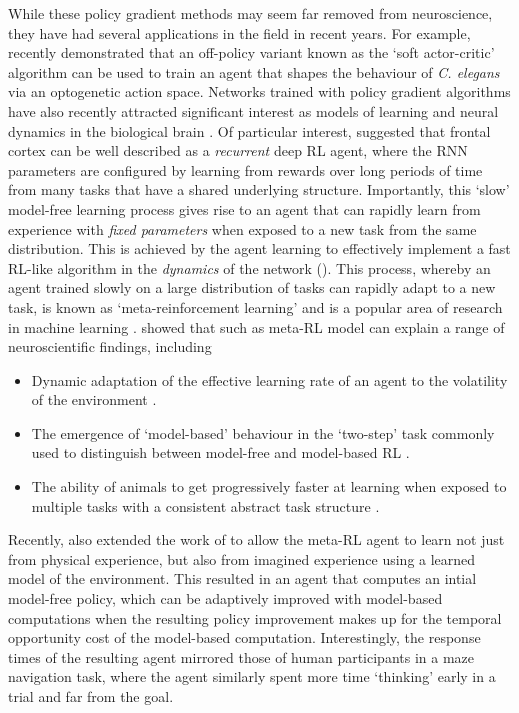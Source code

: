 While these policy gradient methods may seem far removed from neuroscience, they have had several applications in the field in recent years.
For example, \citet{li2022integrating} recently demonstrated that an off-policy variant known as the `soft actor-critic' algorithm \citep{haarnoja2018soft} can be used to train an agent that shapes the behaviour of \textit{C. elegans} via an optogenetic action space.
Networks trained with policy gradient algorithms have also recently attracted significant interest as models of learning and neural dynamics in the biological brain \citep{wang2018prefrontal, jensen2023recurrent, merel2019deep}.
Of particular interest, \citet{wang2018prefrontal} suggested that frontal cortex can be well described as a \emph{recurrent} deep RL agent, where the RNN parameters are configured by learning from rewards over long periods of time from many tasks that have a shared underlying structure.
Importantly, this `slow' model-free learning process gives rise to an agent that can rapidly learn from experience with \emph{fixed parameters} when exposed to a new task from the same distribution.
This is achieved by the agent learning to effectively implement a fast RL-like algorithm in the \emph{dynamics} of the network ().
This process, whereby an agent trained slowly on a large distribution of tasks can rapidly adapt to a new task, is known as `meta-reinforcement learning' and is a popular area of research in machine learning \citep{finn2017model, ritter2018been, duan2016rl, wang2016learning}.
\citet{wang2018prefrontal} showed that such as meta-RL model can explain a range of neuroscientific findings, including
\begin{itemize}
    \item Dynamic adaptation of the effective learning rate of an agent to the volatility of the environment \citep{behrens2007learning}.
    \item The emergence of `model-based' behaviour in the `two-step' task commonly used to distinguish between model-free and model-based RL \citep{miller2017dorsal,daw2011model}.
    \item The ability of animals to get progressively faster at learning when exposed to multiple tasks with a consistent abstract task structure \citep{harlow1949formation}.
\end{itemize}
Recently, \citet{jensen2023recurrent} also extended the work of \citet{wang2018prefrontal} to allow the meta-RL agent to learn not just from physical experience, but also from imagined experience using a learned model of the environment.
This resulted in an agent that computes an intial model-free policy, which can be adaptively improved with model-based computations when the resulting policy improvement makes up for the temporal opportunity cost of the model-based computation.
Interestingly, the response times of the resulting agent mirrored those of human participants in a maze navigation task, where the agent similarly spent more time `thinking' early in a trial and far from the goal.

